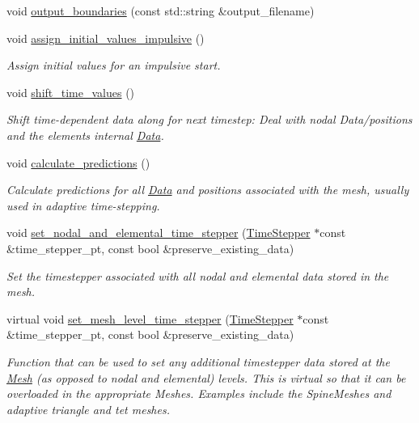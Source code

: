 \begin{DoxyCompactItemize}
void \hyperlink{classoomph_1_1Mesh_a82c291df31d4b6400004ede7c0973106}{output\+\_\+boundaries} (const std\+::string \&output\+\_\+filename)
\item 
void \hyperlink{classoomph_1_1Mesh_ab1ceceaadc7114773f5a70cb52e67081}{assign\+\_\+initial\+\_\+values\+\_\+impulsive} ()
\begin{DoxyCompactList}\small\item\em Assign initial values for an impulsive start. \end{DoxyCompactList}\item 
void \hyperlink{classoomph_1_1Mesh_a7f097aaa854ac697f8016ba3b7e6c982}{shift\+\_\+time\+\_\+values} ()
\begin{DoxyCompactList}\small\item\em Shift time-\/dependent data along for next timestep\+: Deal with nodal Data/positions and the element\textquotesingle{}s internal \hyperlink{classoomph_1_1Data}{Data}. \end{DoxyCompactList}\item 
void \hyperlink{classoomph_1_1Mesh_a823b11b11e6a0c3c22ea86dc60a3da65}{calculate\+\_\+predictions} ()
\begin{DoxyCompactList}\small\item\em Calculate predictions for all \hyperlink{classoomph_1_1Data}{Data} and positions associated with the mesh, usually used in adaptive time-\/stepping. \end{DoxyCompactList}\item 
void \hyperlink{classoomph_1_1Mesh_a6c9a84e7e912c2fef3f513bfcd50fc70}{set\+\_\+nodal\+\_\+and\+\_\+elemental\+\_\+time\+\_\+stepper} (\hyperlink{classoomph_1_1TimeStepper}{Time\+Stepper} $\ast$const \&time\+\_\+stepper\+\_\+pt, const bool \&preserve\+\_\+existing\+\_\+data)
\begin{DoxyCompactList}\small\item\em Set the timestepper associated with all nodal and elemental data stored in the mesh. \end{DoxyCompactList}\item 
virtual void \hyperlink{classoomph_1_1Mesh_a52c30b4ebc67038e137a5de1c5d422e5}{set\+\_\+mesh\+\_\+level\+\_\+time\+\_\+stepper} (\hyperlink{classoomph_1_1TimeStepper}{Time\+Stepper} $\ast$const \&time\+\_\+stepper\+\_\+pt, const bool \&preserve\+\_\+existing\+\_\+data)
\begin{DoxyCompactList}\small\item\em Function that can be used to set any additional timestepper data stored at the \hyperlink{classoomph_1_1Mesh}{Mesh} (as opposed to nodal and elemental) levels. This is virtual so that it can be overloaded in the appropriate Meshes. Examples include the Spine\+Meshes and adaptive triangle and tet meshes. \end{DoxyCompactList}\item 

\end{DoxyCompactItemize}
